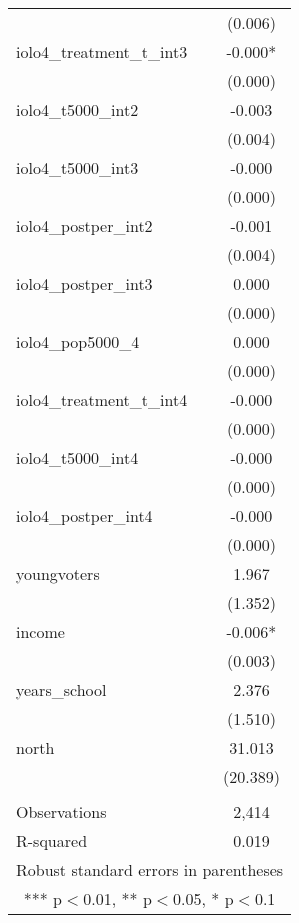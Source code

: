\documentclass[]{article}
\begin{document}
\begin{tabular}{lc}
 & (0.006) \\
iolo4\_treatment\_t\_int3 & -0.000* \\
 & (0.000) \\
iolo4\_t5000\_int2 & -0.003 \\
 & (0.004) \\
iolo4\_t5000\_int3 & -0.000 \\
 & (0.000) \\
iolo4\_postper\_int2 & -0.001 \\
 & (0.004) \\
iolo4\_postper\_int3 & 0.000 \\
 & (0.000) \\
iolo4\_pop5000\_4 & 0.000 \\
 & (0.000) \\
iolo4\_treatment\_t\_int4 & -0.000 \\
 & (0.000) \\
iolo4\_t5000\_int4 & -0.000 \\
 & (0.000) \\
iolo4\_postper\_int4 & -0.000 \\
 & (0.000) \\
youngvoters & 1.967 \\
 & (1.352) \\
income & -0.006* \\
 & (0.003) \\
years\_school & 2.376 \\
 & (1.510) \\
north & 31.013 \\
 & (20.389) \\
 &  \\
Observations & 2,414 \\
 R-squared & 0.019 \\ \hline
\multicolumn{2}{c}{ Robust standard errors in parentheses} \\
\multicolumn{2}{c}{ *** p$<$0.01, ** p$<$0.05, * p$<$0.1} \\
\end{tabular}
\end{document}
